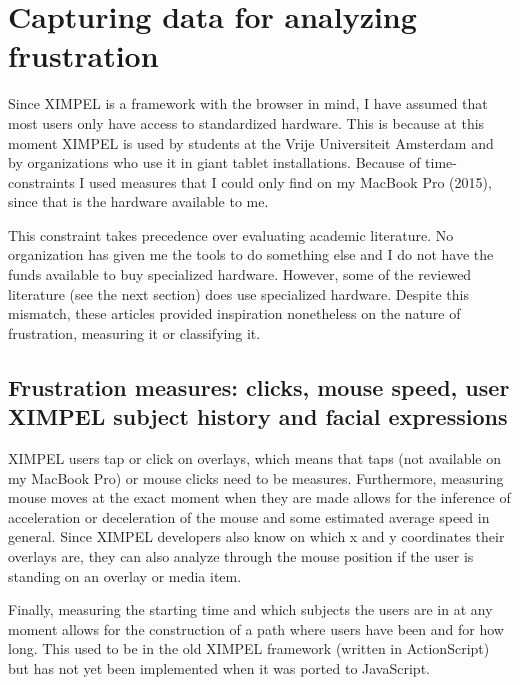 

\section{Capturing data for analyzing frustration}

Since XIMPEL is a framework with the browser in mind, I have assumed that most users only have access to standardized hardware. This is because at this moment XIMPEL is used by students at the Vrije Universiteit Amsterdam and by organizations who use it in giant tablet installations. Because of time-constraints I used measures that I could only find on my MacBook Pro (2015), since that is the hardware available to me. 

This constraint takes precedence over evaluating academic literature. No organization has given me the tools to do something else and I do not have the funds available to buy specialized hardware. However, some of the reviewed literature (see the next section) does use specialized hardware. Despite this mismatch, these articles provided inspiration nonetheless on the nature of frustration, measuring it or classifying it.

\subsection{Frustration measures: clicks, mouse speed, user XIMPEL subject history and facial expressions}
XIMPEL users tap or click on overlays, which means that taps (not available on my MacBook Pro) or mouse clicks need to be measures. Furthermore, measuring mouse moves at the exact moment when they are made allows for the inference of acceleration or deceleration of the mouse and some estimated average speed in general. Since XIMPEL developers also know on which x and y coordinates their overlays are, they can also analyze through the mouse position if the user is standing on an overlay or media item.

Finally, measuring the starting time and which subjects the users are in at any moment allows for the construction of a path where users have been and for how long. This used to be in the old XIMPEL framework (written in ActionScript) but has not yet been implemented when it was ported to JavaScript.

